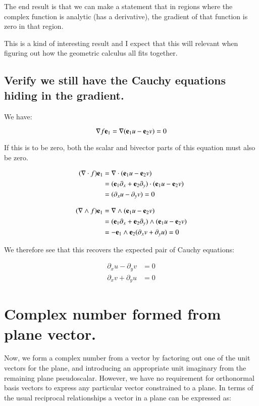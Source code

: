 \documentclass{article}
\newcommand{\grad}[0]{\nabla}
\begin{document}
The end result is that we can make a statement that
in regions where the complex function is analytic (has a derivative), the gradient of that function is zero in that region.

This is a kind of interesting result and I expect that this will relevant when figuring out how the geometric calculus
all fits together.

\subsection{ Verify we still have the Cauchy equations hiding in the gradient. }

We have:

\begin{equation*}
\grad f \Be_1 = \grad ( \Be_1 u - \Be_2 v) = 0
\end{equation*}

If this is to be zero, both the scalar and bivector parts of this equation must also be zero.

\begin{align*}
(\grad \cdot f) \Be_1
&= \grad \cdot ( \Be_1 u - \Be_2 v) \\
&= (\Be_1 \partial_x + \Be_2 \partial_y) \cdot ( \Be_1 u - \Be_2 v) \\
&= (\partial_x u - \partial_y v) = 0
\end{align*}

\begin{align*}
(\grad \wedge f) \Be_1
&= \grad \wedge ( \Be_1 u - \Be_2 v) \\
&= (\Be_1 \partial_x + \Be_2 \partial_y) \wedge ( \Be_1 u - \Be_2 v) \\
&= -\Be_1 \wedge \Be_2 (\partial_x v + \partial_y u) = 0
\end{align*}

We therefore see that this recovers the expected pair of Cauchy equations:

\begin{align*}
\partial_x u - \partial_y v &= 0 \\
\partial_x v + \partial_y u &= 0
\end{align*}

\section{ Complex number formed from plane vector. }

Now, we form a complex number from a vector by factoring out one of the unit vectors for the plane, and introducing an
appropriate unit imaginary from the remaining plane pseudoscalar.
However, we have no requirement for orthonormal basis vectors to
express any particular vector constrained to a plane.  In terms of the usual reciprocal relationships a vector in a plane can be expressed as:
\end{document}
